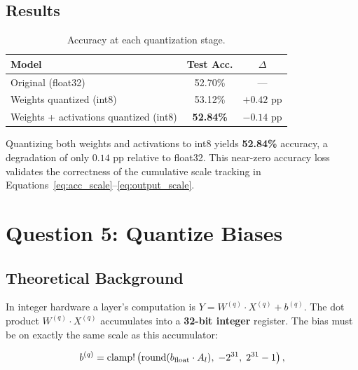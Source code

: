 \documentclass[11pt, letterpaper]{article}
\begin{document}
\subsection{Results}

\begin{table}[H]
  \centering
  \caption{Accuracy at each quantization stage.}
  \begin{tabular}{lcc}
    \toprule
    \textbf{Model}                           & \textbf{Test Acc.} & \textbf{$\Delta$} \\
    \midrule
    Original (float32)                       & 52.70\%   & ---         \\
    Weights quantized (int8)                 & 53.12\%   & $+0.42$ pp  \\
    Weights + activations quantized (int8)   & \textbf{52.84\%}  & $-0.14$ pp  \\
    \bottomrule
  \end{tabular}
\end{table}

Quantizing both weights and activations to int8 yields \textbf{52.84\%} accuracy,
a degradation of only $0.14$ pp relative to float32. This near-zero accuracy loss
validates the correctness of the cumulative scale tracking in
Equations~\eqref{eq:acc_scale}--\eqref{eq:output_scale}.

\section{Question 5: Quantize Biases}

\subsection{Theoretical Background}

In integer hardware a layer's computation is
$Y = W^{(q)} \cdot X^{(q)} + b^{(q)}.$
The dot product $W^{(q)}\cdot X^{(q)}$ accumulates into a \textbf{32-bit integer}
register. The bias must be on exactly the same scale as this accumulator:

\begin{equation}
  b^{(q)} = \mathrm{clamp}\\!\left(
    \mathrm{round}(b_{\mathrm{float}} \cdot A_l),\;
    -2^{31},\; 2^{31}-1
  \right),
  \label{eq:bias_quant}
\end{equation}
\end{document}
